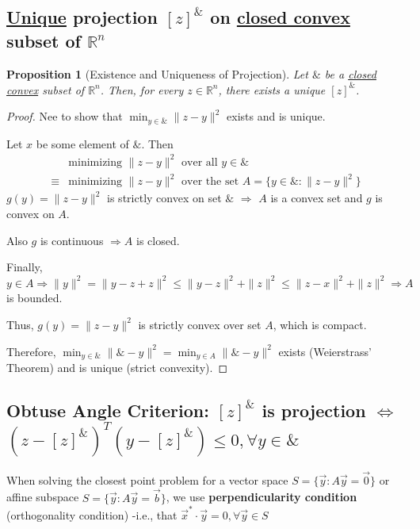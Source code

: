 \documentclass[11pt,a4paper]{article}
\newtheorem{proposition}{Proposition}
\begin{document}
\subsection{\underline{Unique} projection $[z]^\&$ on \underline{closed convex} subset of $\mathbb{R}^n$}
\begin{proposition}
    [Existence and Uniqueness of Projection]
    Let $\&$ be a \underline{closed convex} subset of $\mathbb{R}^n$. Then, for every $z\in \mathbb{R}^n$, there exists a unique $[z]^\&$.
\end{proposition}
\begin{proof}
Nee to show that $\min_{y\in \&}\|z-y\|^2$ exists and is unique.

Let $x$ be some element of $\&$. Then
\begin{equation}
    \begin{aligned}
        &\text{minimizing $\|z-y\|^2$ over all $y\in\&$}\\
        \equiv&\text{minimizing $\|z-y\|^2$ over the set $A=\{y\in\&:\|z-y\|^2\}$}
    \end{aligned}
    \nonumber
\end{equation}
$g(y)=\|z-y\|^2$ is strictly convex on set $\&$ $\Rightarrow$ $A$ is a convex set and $g$ is convex on $A$.

Also $g$ is continuous $\Rightarrow	A$ is closed.

Finally, $y\in A \Rightarrow \|y\|^2=\|y-z+z\|^2\leq \|y-z\|^2+\|z\|^2\leq \|z-x\|^2+\|z\|^2 \Rightarrow A$ is bounded.

Thus, $g(y)=\|z-y\|^2$ is strictly convex over set $A$, which is compact.

Therefore, $\min_{y\in\&}\|\&-y\|^2=\min_{y\in A}\|\&-y\|^2$ exists (Weierstrass’ Theorem) and is unique (strict convexity).
\end{proof}

\subsection{Obtuse Angle Criterion: $[z]^\&$ is projection $\Leftrightarrow$ $(z-[z]^\&)^T(y-[z]^\&)\leq 0, \forall y\in\&$}

When solving the closest point problem for a vector space $S=\{\vec{y}:A \vec{y}=\vec{0}\}$ or affine subspace $S=\{\vec{y}:A \vec{y}=\vec{b}\}$, we use \textbf{perpendicularity condition} (orthogonality condition) -i.e., that $\vec{x}^*\cdot \vec{y}=0,\forall \vec{y}\in S$
\end{document}
